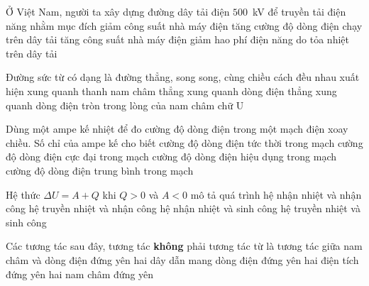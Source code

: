 	\begin{ex}%
		Ở Việt Nam, người ta xây dựng đường dây tải điện $500$~kV để truyền tải điện năng nhằm mục đích
		\choice
		{giảm công suất nhà máy điện}
		{tăng cường độ dòng điện chạy trên dây tải}
		{tăng công suất nhà máy điện}
		{\True giảm hao phí điện năng do tỏa nhiệt trên dây tải}
	\end{ex}

	\begin{ex}%
		Đường sức từ có dạng là đường thẳng, song song, cùng chiều cách đều nhau xuất hiện
		\choice
		{xung quanh thanh nam châm thẳng}
		{xung quanh dòng điện thẳng}
		{xung quanh dòng điện tròn}
		{\True trong lòng của nam châm chữ U}
	\end{ex}

	\begin{ex}%
		Dùng một ampe kế nhiệt để đo cường độ dòng điện trong một mạch điện xoay chiều. Số chỉ của ampe kế cho biết
		\choice
		{cường độ dòng điện tức thời trong mạch}
		{cường độ dòng điện cực đại trong mạch}
		{\True cường độ dòng điện hiệu dụng trong mạch}
		{cường độ dòng điện trung bình trong mạch}
	\end{ex}

	\begin{ex}%
		Hệ thức $\Delta U=A+Q$ khi $Q>0$ và $A<0$ mô tả quá trình
		\choice
		{hệ nhận nhiệt và nhận công}
		{hệ truyền nhiệt và nhận công}
		{\True hệ nhận nhiệt và sinh công}
		{hệ truyền nhiệt và sinh công}
	\end{ex}

	\begin{ex}%
		Các tương tác sau đây, tương tác \textbf{không} phải tương tác từ là tương tác giữa
		\choice
		{nam châm và dòng điện đứng yên}
		{hai dây dẫn mang dòng điện đứng yên}
		{\True hai điện tích đứng yên}
		{hai nam châm đứng yên}
	\end{ex}

